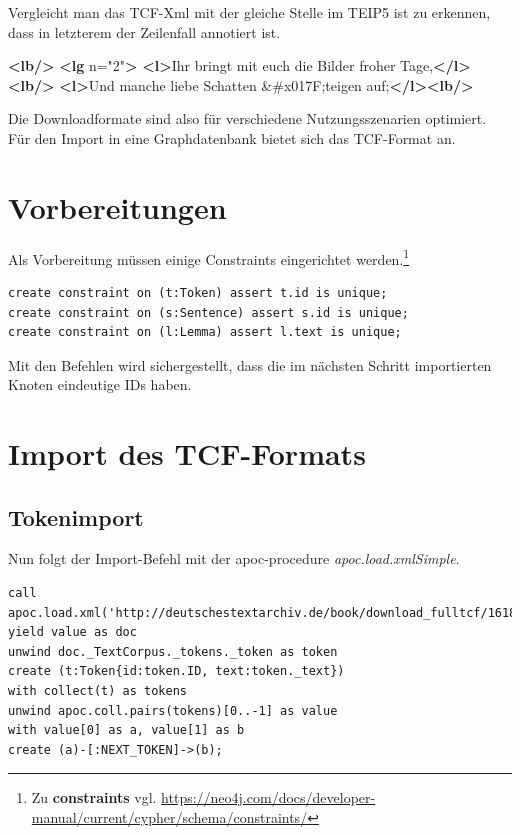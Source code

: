 \documentclass[ngerman,]{scrreprt}
\newenvironment{Shaded}{}{}
\newcommand{\KeywordTok}[1]{\textcolor[rgb]{0.00,0.44,0.13}{\textbf{#1}}}
\newcommand{\DecValTok}[1]{\textcolor[rgb]{0.25,0.63,0.44}{#1}}
\newcommand{\StringTok}[1]{\textcolor[rgb]{0.25,0.44,0.63}{#1}}
\newcommand{\OtherTok}[1]{\textcolor[rgb]{0.00,0.44,0.13}{#1}}
\newcommand{\NormalTok}[1]{#1}
\begin{document}
Vergleicht man das TCF-Xml mit der gleiche Stelle im TEIP5 ist zu erkennen, dass in letzterem der Zeilenfall annotiert ist.

\begin{Shaded}
\begin{Highlighting}[]
\KeywordTok{<lb/>}
  \KeywordTok{<lg}\OtherTok{ n=}\StringTok{"2"}\KeywordTok{>}
      \KeywordTok{<l>}\NormalTok{Ihr bringt mit euch die Bilder froher Tage,}\KeywordTok{</l><lb/>}
      \KeywordTok{<l>}\NormalTok{Und manche liebe Schatten }\DecValTok{&#x017F;}\NormalTok{teigen auf;}\KeywordTok{</l><lb/>}
\end{Highlighting}
\end{Shaded}

Die Downloadformate sind also für verschiedene Nutzungsszenarien optimiert. Für den Import in eine Graphdatenbank bietet sich das TCF-Format an.

\section{Vorbereitungen}\label{vorbereitungen}

Als Vorbereitung müssen einige Constraints eingerichtet werden.\footnote{Zu \textbf{constraints} vgl. \url{https://neo4j.com/docs/developer-manual/current/cypher/schema/constraints/}}

\begin{verbatim}
create constraint on (t:Token) assert t.id is unique;
create constraint on (s:Sentence) assert s.id is unique;
create constraint on (l:Lemma) assert l.text is unique;
\end{verbatim}

Mit den Befehlen wird sichergestellt, dass die im nächsten Schritt importierten Knoten eindeutige IDs haben.

\section{Import des TCF-Formats}\label{import-des-tcf-formats}

\subsection{Tokenimport}\label{tokenimport}

Nun folgt der Import-Befehl mit der apoc-procedure \emph{apoc.load.xmlSimple}.

\begin{verbatim}
call apoc.load.xml('http://deutschestextarchiv.de/book/download_fulltcf/16181') yield value as doc
unwind doc._TextCorpus._tokens._token as token
create (t:Token{id:token.ID, text:token._text})
with collect(t) as tokens
unwind apoc.coll.pairs(tokens)[0..-1] as value
with value[0] as a, value[1] as b
create (a)-[:NEXT_TOKEN]->(b);
\end{verbatim}
\end{document}

